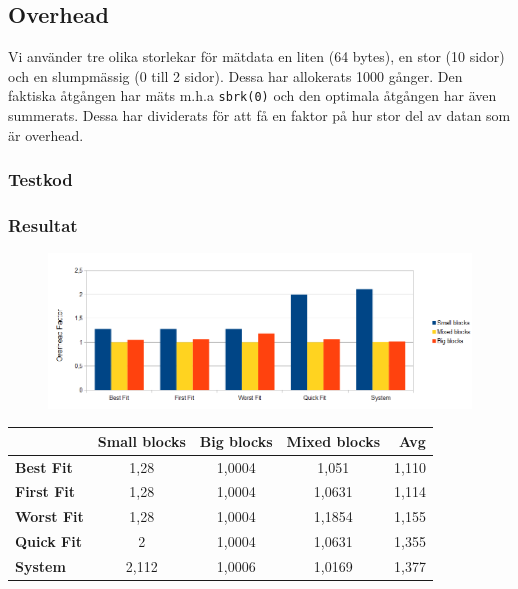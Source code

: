 \documentclass[a4paper,10pt,titlepage]{article}
\begin{document}
\subsection{Overhead}

Vi använder tre olika storlekar för mätdata en liten (64 bytes), en stor (10 sidor) och en slumpmässig (0 till 2 sidor). Dessa har allokerats 1000 gånger. Den faktiska åtgången har mäts m.h.a \texttt{sbrk(0)} och den optimala åtgången har även summerats. Dessa har dividerats för att få en faktor på hur stor del av datan som är overhead.

\subsubsection{Testkod}

\scriptsize{}
\normalsize

\subsubsection{Resultat}

\begin{figure}[H]
	\includegraphics[width=\textwidth]{overhead.png}
\end{figure}

\begin{center}

	\begin{tabular}{ | >{\bfseries}l | c | c | c | r |}
		\hline
					& Small blocks	& Big blocks	& Mixed blocks	& Avg \\
		\hline
		Best Fit	& 1,28	& 1,0004	& 1,051		& 1,110 \\
		First Fit	& 1,28	& 1,0004	& 1,0631	& 1,114 \\
		Worst Fit	& 1,28	& 1,0004	& 1,1854	& 1,155 \\
		Quick Fit	& 2		& 1,0004	& 1,0631	& 1,355 \\
		System		& 2,112	& 1,0006	& 1,0169	& 1,377 \\
		\hline
	\end{tabular}
\end{center}
\end{document}
